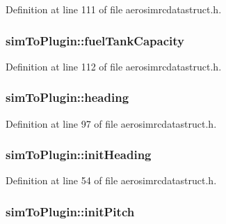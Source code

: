 Definition at line 111 of file aerosimrcdatastruct.\-h.

\hypertarget{group___aero_sim_r_c_ga9d9432e29718f1a2d3e3bb4445bb3705}{
\subsubsection[{fuel\-Tank\-Capacity}]{ sim\-To\-Plugin\-::fuel\-Tank\-Capacity}}\label{group___aero_sim_r_c_ga9d9432e29718f1a2d3e3bb4445bb3705}


Definition at line 112 of file aerosimrcdatastruct.\-h.

\hypertarget{group___aero_sim_r_c_ga62f831b287508b68a2b0ad45a9d2dc18}{
\subsubsection[{heading}]{ sim\-To\-Plugin\-::heading}}\label{group___aero_sim_r_c_ga62f831b287508b68a2b0ad45a9d2dc18}


Definition at line 97 of file aerosimrcdatastruct.\-h.

\hypertarget{group___aero_sim_r_c_gaab0124b4fd93c132aacdb2cb2a755770}{
\subsubsection[{init\-Heading}]{ sim\-To\-Plugin\-::init\-Heading}}\label{group___aero_sim_r_c_gaab0124b4fd93c132aacdb2cb2a755770}


Definition at line 54 of file aerosimrcdatastruct.\-h.

\hypertarget{group___aero_sim_r_c_gacc022659d5c4b32c0a878bdc6eea0f53}{
\subsubsection[{init\-Pitch}]{ sim\-To\-Plugin\-::init\-Pitch}}\label{group___aero_sim_r_c_gacc022659d5c4b32c0a878bdc6eea0f53}


